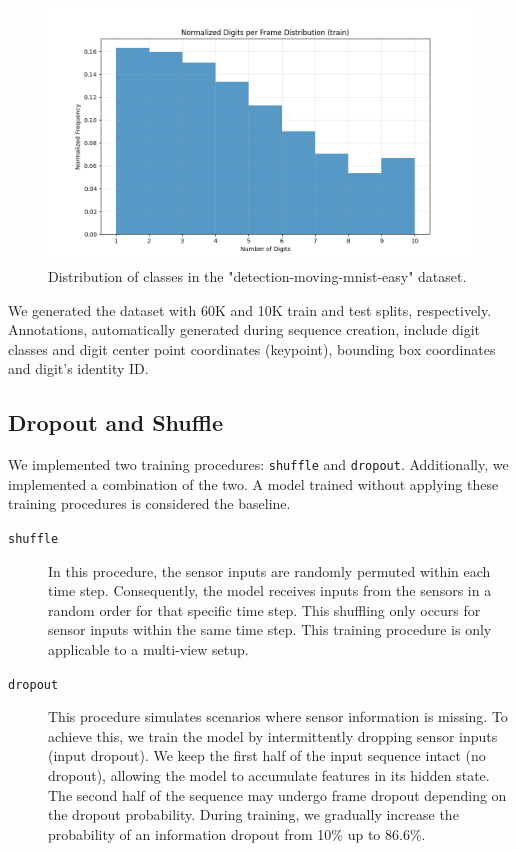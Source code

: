 \begin{figure}
    \centering
    \includegraphics[width=\textwidth]{figures/figure_method_dataset_train_digits_per_frame.png}
    \caption{Distribution of classes in the "detection-moving-mnist-easy" dataset.}
    \label{fig:figure_method_dataset_train_digits_per_frame}
\end{figure}

We generated the dataset with 60K and 10K train and test splits, respectively. Annotations, automatically generated during sequence creation, include digit classes and digit center point coordinates (keypoint), bounding box coordinates and digit's identity ID.

\subsection{Dropout and Shuffle} \label{Methods:Training:DropoutAndShuffle}

We implemented two training procedures: \texttt{shuffle} and \texttt{dropout}. Additionally, we implemented a combination of the two. A model trained without applying these training procedures is considered the baseline.

\begin{description}
    \item[\texttt{shuffle}] In this procedure, the sensor inputs are randomly permuted within each time step. Consequently, the model receives inputs from the sensors in a random order for that specific time step. This shuffling only occurs for sensor inputs within the same time step. This training procedure is only applicable to a multi-view setup.

    \item[\texttt{dropout}] This procedure simulates scenarios where sensor information is missing. To achieve this, we train the model by intermittently dropping sensor inputs (input dropout). We keep the first half of the input sequence intact (no dropout), allowing the model to accumulate features in its hidden state. The second half of the sequence may undergo frame dropout depending on the dropout probability. During training, we gradually increase the probability of an information dropout from 10\% up to 86.6\%.
\end{description}

